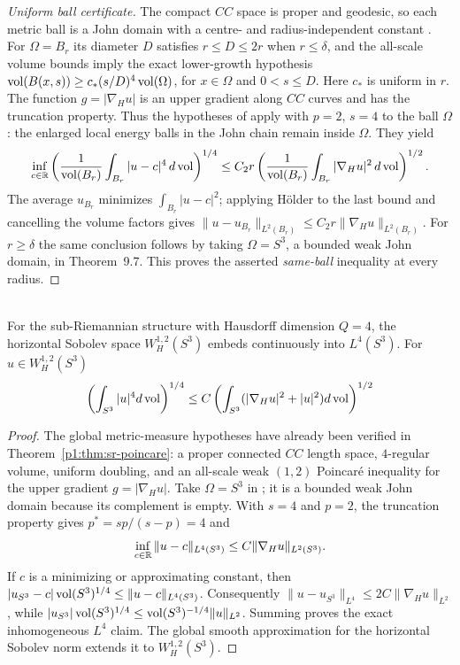 \documentclass[11pt]{article}
\begin{document}
\begin{proof}[Uniform ball certificate]
The compact $CC$ space is proper and geodesic, so each metric ball is a
John domain with a centre- and radius-independent constant
\cite[Corollary~9.5]{hajlaszkoskela2000}.  For $\Omega=B_r$ its diameter
$D$ satisfies $r\le D\le2r$ when $r\le\delta$, and the all-scale
volume bounds imply the exact lower-growth hypothesis
$\operatorname{vol}(B(x,s))\ge c_* (s/D)^4\operatorname{vol}(\Omega)$, for $x\in\Omega$ and
$0<s\le D$.  Here $c_*$ is uniform in $r$.  The function
$g=|\nabla_Hu|$ is an upper gradient along $CC$ curves and has the
truncation property.  Thus the hypotheses of
\cite[Theorem~9.7 and Corollary~9.8]{hajlaszkoskela2000}
apply with $p=2$, $s=4$ to the ball $\Omega$: the enlarged local
energy balls in the John chain remain inside $\Omega$.  They yield
\[
 \inf_{c\in\mathbb{R}}
 \left(\frac{1}{\operatorname{vol}(B_r)}\int_{B_r}|u-c|^4\,d\operatorname{vol}\right)^{1/4}
 \le C_2 r
 \left(\frac{1}{\operatorname{vol}(B_r)}\int_{B_r}|\nabla_Hu|^2\,d\operatorname{vol}\right)^{1/2}.
\]
The average $u_{B_r}$ minimizes $\int_{B_r}|u-c|^2$; applying
H\"older to the last bound and cancelling the volume factors gives
$\|u-u_{B_r}\|_{L^2(B_r)}\le C_2r
\|\nabla_Hu\|_{L^2(B_r)}$.  For $r\ge\delta$ the same conclusion
follows by taking $\Omega=S^3$, a bounded weak John domain, in
Theorem~9.7.  This proves the asserted \emph{same-ball} inequality
at every radius.
\end{proof}


\begin{theorem}
\label{p1:thm:sr-sobolev}
\mbox{}\\[6pt] 
For the sub-Riemannian structure with Hausdorff dimension $Q=4$, the horizontal Sobolev space $W^{1,2}_H(S^3)$ embeds continuously into $L^4(S^3)$. For $u \in W^{1,2}_H(S^3)$
\[
\left(\int_{S^3} |u|^4 d\operatorname{vol}\right)^{1/4} \leq C \left(\int_{S^3} (|\nabla_H u|^2 + |u|^2) d\operatorname{vol}\right)^{1/2}
\]
\cite{hajlaszkoskela2000}
\end{theorem}
\begin{proof}
The global metric-measure hypotheses have already been verified in
Theorem~\ref{p1:thm:sr-poincare}: a proper connected $CC$ length space,
$4$-regular volume, uniform doubling, and an all-scale weak $(1,2)$
Poincar\'e inequality for the upper gradient $g=|\nabla_Hu|$.
Take $\Omega=S^3$ in
\cite[Theorem~9.7]{hajlaszkoskela2000}; it is a bounded weak John
domain because its complement is empty.  With $s=4$ and $p=2$, the
truncation property gives $p^*=sp/(s-p)=4$ and
\[
 \inf_{c\in\mathbb{R}}\|u-c\|_{L^4(S^3)}
 \le C\|\nabla_Hu\|_{L^2(S^3)}.
\]
If $c$ is a minimizing or approximating constant, then
$|u_{S^3}-c|\operatorname{vol}(S^3)^{1/4}\le\|u-c\|_{L^4(S^3)}$.
Consequently $\|u-u_{S^3}\|_{L^4}\le
2C\|\nabla_Hu\|_{L^2}$, while
$|u_{S^3}|\operatorname{vol}(S^3)^{1/4}\le
\operatorname{vol}(S^3)^{-1/4}\|u\|_{L^2}$.  Summing proves the exact
inhomogeneous $L^4$ claim.  The global smooth approximation for the
horizontal Sobolev norm extends it to $W_H^{1,2}(S^3)$.
\end{proof}
\end{document}
